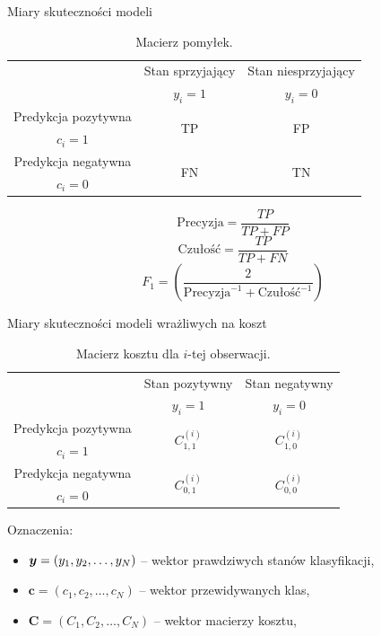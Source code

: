 \documentclass{beamer}
\begin{document}
\begin{frame}{Miary skuteczności modeli}
	\begin{table}
		\begin{center}
			\begin{tabular}{c|c|c}
				\multirow{2}{8em}{} & Stan sprzyjający & Stan niesprzyjający \\
				& $y_i = 1$            & $y_i = 0$ \\
				\hline
				Predykcja pozytywna & \multirow{2}{8em}{\centering TP} & \multirow{2}{8em}{\centering FP} \\
				$c_i = 1$ &  &                 \\
				\hline
				Predykcja negatywna & \multirow{2}{8em}{\centering FN} & \multirow{2}{8em}{\centering TN} \\
				$c_i = 0$ &  &  \\
			\end{tabular}
		\end{center}
		\caption{Macierz pomyłek.}
		\label{tab:macierz-pomylek}
	\end{table}
	$$ \text{Precyzja} = \frac{TP}{TP + FP} $$ 
	$$ \text{Czułość}= \frac{TP}{TP + FN} $$
	$$ F_1 = \left(\frac{2}{\text{Precyzja}^{-1} + \text{Czułość}^{-1}}\right) $$
\end{frame}

\begin{frame}{Miary skuteczności modeli wrażliwych na koszt}
	\begin{table}
		\begin{center}
			\begin{tabular}{c|c|c}
				\multirow{2}{4em}{} & Stan pozytywny & Stan negatywny \\
				& $y_i = 1$            & $y_i = 0$ \\
				\hline
				Predykcja pozytywna & \multirow{2}{4em}{\centering $C^{(i)}_{1,1}$} & \multirow{2}{4em}{\centering $C^{(i)}_{1,0}$} \\
				$c_i = 1$         &                    &                    \\
				\hline
				Predykcja negatywna & \multirow{2}{4em}{\centering $C^{(i)}_{0,1}$} & \multirow{2}{4em}{\centering $C^{(i)}_{0,0}$} \\
				$c_i = 0$         &                    &                    \\
			\end{tabular}
		\end{center}
		\caption{Macierz kosztu dla $i$-tej obserwacji.}
		\label{tab:macierz-kosztu}
	\end{table}

	Oznaczenia:
	\begin{itemize}
		\item $\boldsymbol{y} = (y_1, y_2, \dots, y_N)$ -- wektor prawdziwych stanów klasyfikacji,
		\item $\boldsymbol{c} = (c_1, c_2, \dots, c_N) $ -- wektor przewidywanych klas,
		\item $ \boldsymbol{C} = (C_1, C_2, \dots, C_N) $ -- wektor macierzy kosztu,
	\end{itemize}
\end{frame}
\end{document}
